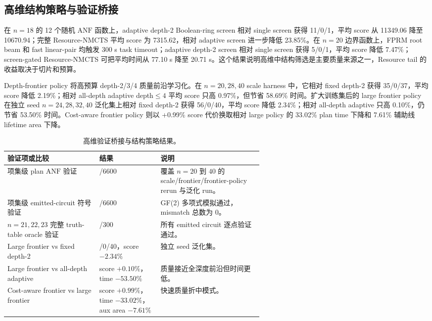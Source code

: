 \documentclass[UTF8,fontset=macnew,11pt]{ctexart}
\newcommand{\method}{Resource-NMCTS}
\newcommand{\anf}{\ensuremath{\mathrm{ANF}}}
\newcommand{\ttable}{truth-table}
\begin{document}
\subsection{高维结构策略与验证桥接}

在 $n=18$ 的 12 个随机 \anf{} 函数上，adaptive depth-2 Boolean-ring screen 相对 single screen 获得 11/0/1，平均 score 从 11349.06 降至 10670.94；完整 \method{} 平均 score 为 7315.62，相对 adaptive screen 进一步降低 23.85\%。在 $n=20$ 边界函数上，FPRM root beam 和 fast linear-pair 均触发 300 s task timeout；adaptive depth-2 screen 相对 single screen 获得 5/0/1，平均 score 降低 7.47\%；screen-gated \method{} 可把平均时间从 77.10 s 降至 20.71 s。这个结果说明高维中结构筛选是主要质量来源之一，Resource tail 的收益取决于切片和预算。

Depth-frontier policy 将高预算 depth-2/3/4 质量前沿学习化。在 $n=20,28,40$ scale harness 中，它相对 fixed depth-2 获得 35/0/37，平均 score 降低 2.19\%；相对 all-depth adaptive depth$\leq4$ 平均 score 只高 0.97\%，但节省 58.69\% 时间。扩大训练集后的 large frontier policy 在独立 seed $n=24,28,32,40$ 泛化集上相对 fixed depth-2 获得 56/0/40，平均 score 降低 2.34\%；相对 all-depth adaptive 只高 0.10\%，仍节省 53.50\% 时间。Cost-aware frontier policy 则以 +0.99\% score 代价换取相对 large policy 的 33.02\% plan time 下降和 7.61\% 辅助线 lifetime area 下降。

\begin{table}[H]
\centering
\small
\caption{高维验证桥接与结构策略结果。}
\label{tab:highdim-validation}
\begin{tabularx}{\linewidth}{>{\raggedright\arraybackslash}p{0.36\linewidth}>{\raggedright\arraybackslash}p{0.24\linewidth}>{\raggedright\arraybackslash}X}
\toprule
验证项或比较 & 结果 & 说明 \\
\midrule
项集级 plan \anf{} 验证 & 6600/6600 & 覆盖 $n=20$ 到 $40$ 的 scale/frontier/frontier-policy rerun 与泛化 run。 \\
项集级 emitted-circuit 符号验证 & 6600/6600 & GF(2) 多项式模拟通过，mismatch 总数为 0。 \\
$n=21,22,23$ 完整 \ttable{} oracle 验证 & 300/300 & 所有 emitted circuit 逐点验证通过。 \\
Large frontier vs fixed depth-2 & 56/0/40，score $-2.34\%$ & 独立 seed 泛化集。 \\
Large frontier vs all-depth adaptive & score $+0.10\%$，time $-53.50\%$ & 质量接近全深度前沿但时间更低。 \\
Cost-aware frontier vs large frontier & score $+0.99\%$，time $-33.02\%$，aux area $-7.61\%$ & 快速质量折中模式。 \\
\bottomrule
\end{tabularx}
\end{table}
\end{document}
